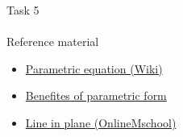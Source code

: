 \documentclass[aspectratio=169]{beamer}
\newcommand{\fbckg}[1]{\usebackgroundtemplate{\texttt{[image: \#1]}}}%
\begin{document}
\begin{frame}[t]{Task 5}
    \framesubtitle{}
\end{frame}

\begin{frame}[t]{Reference material}
    \Large
    \begin{itemize}
        \item \href{https://en.wikipedia.org/wiki/Parametric_equation}{Parametric equation (Wiki)}
        \item \href{https://www.youtube.com/watch?v=3gbxDyivUx0}{Benefites of parametric form}
        \item \href{https://onlinemschool.com/math/library/analytic_geometry/line/}{Line in plane (OnlineMschool)}
    \end{itemize}
\end{frame}

\fbckg{fibeamer/figs/last_page.png}
\frame[plain]{}
\end{document}
